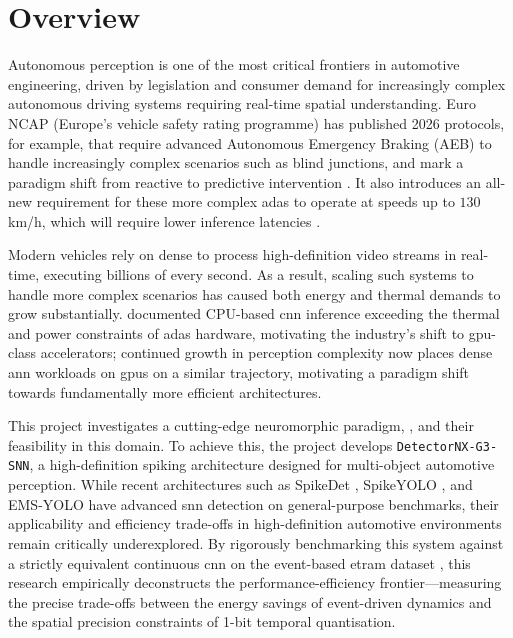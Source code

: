 \section{Overview}
\label{sec:intro_overview}

Autonomous perception is one of the most critical frontiers in automotive engineering,
driven by legislation and consumer demand for increasingly complex autonomous driving systems requiring real-time spatial understanding.
Euro NCAP (Europe's vehicle safety rating programme) has published 2026 protocols, for example, that require advanced Autonomous Emergency Braking (AEB) to handle increasingly complex scenarios such as blind junctions, and mark a paradigm shift from reactive to predictive intervention \cite{EuroNCAP2025FrontalCollisions}.
It also introduces an all-new requirement for these more complex \gls{adas} to operate at speeds up to $130$\,km/h, which will require lower inference latencies \cite{EuroNCAP_SafeDriving_VehicleAssistance_2025}.

Modern vehicles rely on dense  to process high-definition video streams in real-time,
executing billions of  every second.
As a result, scaling such systems to handle more complex scenarios has caused both energy and thermal demands to grow substantially.
\textcite{lin_adas_cnn_issues} documented CPU-based \gls{cnn} inference exceeding the thermal and power constraints of \gls{adas} hardware, motivating the industry's shift to \gls{gpu}-class accelerators; 
continued growth in perception complexity now places dense \gls{ann} workloads on \glspl{gpu} on a similar trajectory, motivating a paradigm shift towards fundamentally more efficient architectures.

This project investigates a cutting-edge neuromorphic paradigm, , and their feasibility in this domain.
To achieve this, the project develops \texttt{DetectorNX-G3-SNN}, a high-definition spiking architecture designed for multi-object automotive perception. 
While recent architectures such as SpikeDet \cite{fan2025spikedet}, SpikeYOLO \cite{spike_yolo}, and EMS-YOLO \cite{ems_yolo} have advanced \gls{snn} detection on general-purpose benchmarks, their applicability and efficiency trade-offs in high-definition automotive environments remain critically underexplored.
By rigorously benchmarking this system against a strictly equivalent continuous \gls{cnn} on the event-based \acrfull{etram} dataset \parencite{Verma_2024_CVPR}, 
this research empirically deconstructs the performance-efficiency frontier---measuring the precise trade-offs between the energy savings of event-driven dynamics and the spatial precision constraints of 1-bit temporal quantisation.